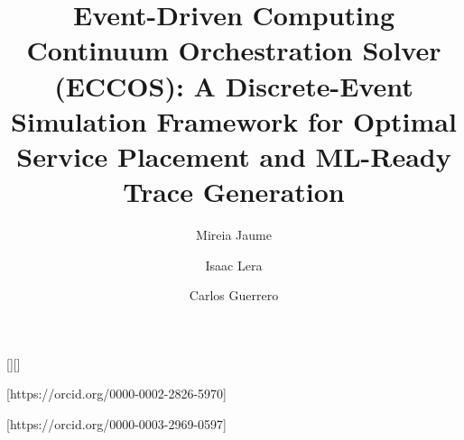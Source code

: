 \documentclass[ASNA]{USG} %
\begin{document}
\title{Event-Driven Computing Continuum Orchestration Solver (ECCOS): A Discrete-Event Simulation Framework for Optimal Service Placement and ML-Ready Trace Generation}
\author[1]{Mireia Jaume}[][]%
\author[1]{Isaac Lera}[https://orcid.org/0000-0002-2826-5970]
\author[1]{Carlos Guerrero}[https://orcid.org/0000-0003-2969-0597]

















\end{document}

